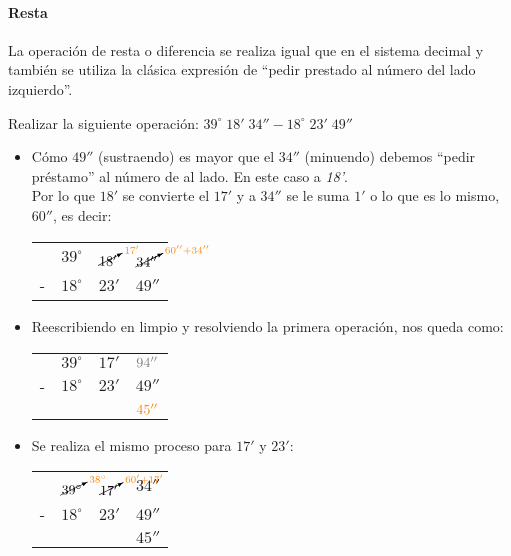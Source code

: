 \paragraph{Resta}
La operación de resta o diferencia se realiza igual que en el sistema decimal y 
también se utiliza la clásica expresión de ``pedir prestado al número del lado 
izquierdo''.
\begin{example}
	Realizar la siguiente operación:
	$39^\circ\; 18'\; 34'' - 18^\circ\; 23'\; 49'' $
	\begin{itemize}
		\item Cómo $49''$ (sustraendo) es mayor que el $34''$ (minuendo) debemos
		``pedir préstamo'' al número de al lado. En este caso a \textit{18'}.\\
		Por lo que $18'$ se convierte el $17'$ y a $34''$ se le suma $1'$ o lo que 
		es lo mismo, $60''$, es decir:
		
		\begin{center}
			\begin{tabular}{ c c c c}
					& $39^\circ$ & 
					$\cancelto{\textcolor{orange}{17'}}{18'}$ & 
					$\cancelto{\textcolor{orange}{60'' + 34''}}{34''}$ \\
				- & $18^\circ$  & $23'$ & $49''$ \\
				\hline
			\end{tabular}
		\end{center}	

	\item Reescribiendo en limpio y resolviendo la primera operación, nos queda 
	como:
	\begin{center}
		\begin{tabular}{ c c c c}
				& $39^\circ$ & 
				$17'$ & 
				$\textcolor{gray}{94''}$ \\
			- & $18^\circ$  & $23'$ & $49''$ \\
			\hline
			&  &   & $\textcolor{orange}{45''}$
		\end{tabular}
	\end{center}

	\item Se realiza el mismo proceso para $17'$ y $23'$:
	\begin{center}
		\begin{tabular}{ c c c c}
				& $\cancelto{\textcolor{orange}{38^\circ}}{39^\circ}$ & 
				$\cancelto{\textcolor{orange}{60' + 17'}}{17'}$ & 
				$34''$ \\
			- & $18^\circ$  & $23'$ & $49''$ \\
			\hline
			&  &   & $45''$
		\end{tabular}
	\end{center}	


\end{itemize}
\end{example}
